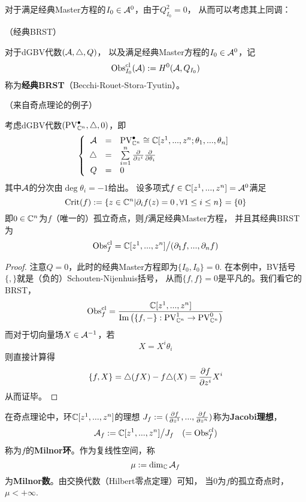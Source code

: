 
对于满足经典Master方程的$I_0\in\mathcal{A}^0$，由于$Q_{I_0}^2=0$，
从而可以考虑其上同调：

\begin{definition}（经典BRST）

对于dGBV代数$(\mathcal{A},\triangle,Q)$，
以及满足经典Master方程的$I_0\in\mathcal{A}^0$，记
$$\operatorname{Obs}^{\operatorname{cl}}_{I_0}(\mathcal{A}):=H^0(\mathcal{A},Q_{I_0})$$
称为\textbf{经典BRST}（Becchi-Rouet-Stora-Tyutin）。
\end{definition}

\begin{example}（来自奇点理论的例子）

考虑dGBV代数$(\operatorname{PV}_{\mathbb{C}^n}^{\bullet},\triangle,0)$，即
$$
  \left\{
    \begin{array}{rcl}
      \mathcal{A}&=&\operatorname{PV}^{\bullet}_{\mathbb{C}^n}
               \cong\mathbb{C}[z^1,...,z^n;\theta_1,...,\theta_n]\\
      \triangle   &=&\sum\limits_{i=1}^n\frac{\partial } {\partial z^i}\frac{\partial } {\partial \theta_i}\\
      Q     &=&0
    \end{array}
  \right.
$$
其中$\mathcal{A}$的分次由$\deg\theta_i=-1$给出。
设多项式$f\in\mathbb{C}[z^1,...,z^n]=\mathcal{A}^0$满足
$$\operatorname{Crit}(f):=\{z\in\mathbb{C}^n|\partial_if(z)=0\,,\forall 1\leq i\leq n\}=\{0\}$$
即$0\in\mathbb{C}^n$为$f$（唯一的）孤立奇点，则$f$满足经典Master方程，
并且其经典BRST为
$$\operatorname{Obs}^{\operatorname{cl}}_f=\mathbb{C}[z^1,...,z^n]\big/(\partial_1f,...,\partial_nf)$$
\end{example}
\begin{proof}
注意$Q=0$，此时的经典Master方程即为$\{I_0,I_0\}=0$.
在本例中，BV括号$\{,\}$就是（负的）Schouten-Nijenhuis括号，
从而$\{f,f\}=0$是平凡的。我们看它的BRST，
$$
  \operatorname{Obs}^{\operatorname{cl}}_f=
    \frac{\mathbb{C}[z^1,...,z^n]}
         {\operatorname{Im}\left(
               \{f,-\}:\operatorname{PV}^1_{\mathbb{C}^n}\to\operatorname{PV}^0_{\mathbb{C}^n}
             \right)
         }
$$
而对于切向量场$X\in\mathcal{A}^{-1}$，若
$$X=X^i\theta_i$$
则直接计算得
$$\{f,X\}=\triangle(fX)-f\triangle(X)=\frac{\partial f} {\partial z^i}X^i$$
从而证毕。
\end{proof}

在奇点理论中，环$\mathbb{C}[z^1,...,z^n]$的理想
$J_f:=(\frac{\partial f} {\partial z^1},...,\frac{\partial f} {\partial z^n})$称为\textbf{Jacobi理想}，
$$\mathcal{A}_f:=\mathbb{C}[z^1,...,z^n]\big/J_f\quad(=\operatorname{Obs}^{cl}_f)$$
称为$f$的\textbf{Milnor环}。作为复线性空间，称
$$\mu:=\dim_{\mathbb{C}}\mathcal{A}_f$$
为\textbf{Milnor数}。由交换代数（Hilbert零点定理）可知，
当$0$为$f$的孤立奇点时，$\mu<+\infty$.

